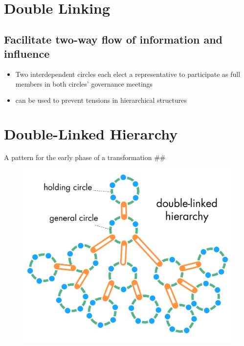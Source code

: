 \section{Double Linking}
\label{doublelinking}

\subsection{Facilitate two-way flow of information and influence}
\label{facilitatetwo-wayflowofinformationandinfluence}

\begin{itemize}
\item Two interdependent circles each elect a representative to participate as full members in both circles' governance meetings

\item can be used to prevent tensions in hierarchical structures

\end{itemize}

\section{Double-Linked Hierarchy}
\label{double-linkedhierarchy}

A pattern for the early phase of a transformation \#\#

\begin{figure}[htbp]
\centering
\includegraphics[keepaspectratio,width=\textwidth,height=0.75\textheight]{img/structural-patterns/double-linked-hierarchy.png}
\end{figure}

